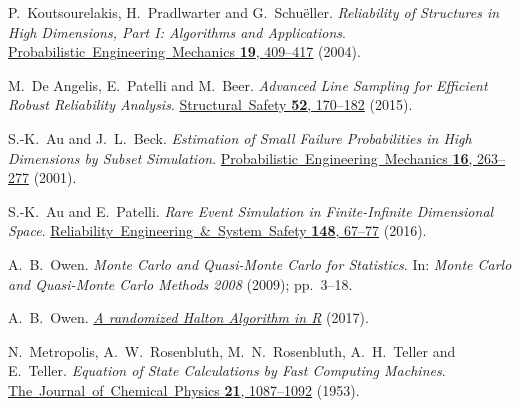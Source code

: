 {\hangindent=0.33in {}\hypertarget{9920150670139184364}{}P.~Koutsourelakis, H.~Pradlwarter and G.~Schuëller. \emph{Reliability of Structures in High Dimensions, Part I: Algorithms and Applications}. \href{https://doi.org/10.1016/j.probengmech.2004.05.001}{Probabilistic~Engineering~Mechanics \textbf{19}, 409–417} (2004).

\hangindent=0.33in {}\hypertarget{12068672950609541734}{}M.~De Angelis, E.~Patelli and M.~Beer. \emph{Advanced Line Sampling for Efficient Robust Reliability Analysis}. \href{https://doi.org/10.1016/j.strusafe.2014.10.002}{Structural~Safety \textbf{52}, 170–182} (2015).

\hangindent=0.33in {}\hypertarget{15932307010839829307}{}S.-K.~Au and J.~L.~Beck. \emph{Estimation of Small Failure Probabilities in High Dimensions by Subset Simulation}. \href{https://doi.org/10.1016/S0266-8920(01)00019-4}{Probabilistic~Engineering~Mechanics \textbf{16}, 263–277} (2001).

\hangindent=0.33in {}\hypertarget{345953961655055560}{}S.-K.~Au and E.~Patelli. \emph{Rare Event Simulation in Finite-Infinite Dimensional Space}. \href{https://doi.org/10.1016/j.ress.2015.11.012}{Reliability~Engineering~\&~System~Safety \textbf{148}, 67–77} (2016).

\hangindent=0.33in {}\hypertarget{3929737418388848918}{}A.~B.~Owen. \emph{Monte Carlo and Quasi-Monte Carlo for Statistics}. In: \emph{Monte Carlo and Quasi-Monte Carlo Methods 2008} (2009); pp.~3–18.

\hangindent=0.33in {}\hypertarget{8155427533001242046}{}A.~B.~Owen. \href{https://artowen.su.domains/reports/rhalton.pdf}{\emph{A randomized Halton Algorithm in R}} (2017).

\hangindent=0.33in {}\hypertarget{7743418060059618696}{}N.~Metropolis, A.~W.~Rosenbluth, M.~N.~Rosenbluth, A.~H.~Teller and E.~Teller. \emph{Equation of State Calculations by Fast Computing Machines}. \href{https://doi.org/10.1063/1.1699114}{The~Journal~of~Chemical~Physics \textbf{21}, 1087–1092} (1953).

}
